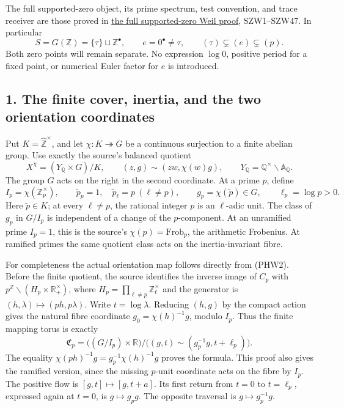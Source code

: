 \documentclass[
  10pt,
  a4paper,
]{article}
\begin{document}
The full supported-zero object, its prime spectrum, test convention, and
trace receiver are those proved in
\href{https://github.com/KokunoYumeto/zeta-function-research-reader/blob/adfbfe74fa49e31cb7aa068cf755fb083be37c32/workbenches/splitzero-tandem/branches/tau-zero-prime-positivity/SUPPORTED_ZERO_PRIME_WEIL_DERIVATION.md}{the
full supported-zero Weil proof}, SZW1--SZW47. In particular \[
S=G(\mathbb Z)=\{\tau\}\sqcup\mathbb Z^\bullet,
\qquad e=0^\bullet\ne\tau,
\qquad(\tau)\subsetneq(e)\subsetneq(p).
\tag{PHW1}
\] Both zero points will remain separate. No expression \(\log0\),
positive period for a fixed point, or numerical Euler factor for \(e\)
is introduced.

\subsection{1. The finite cover, inertia, and the two orientation
coordinates}\label{the-finite-cover-inertia-and-the-two-orientation-coordinates}

Put \(K=\widehat{\mathbb Z}^{\times}\), and let
\(\chi:K\twoheadrightarrow G\) be a continuous surjection to a finite
abelian group. Use exactly the source's balanced quotient \[
X^\chi=(Y_{\mathbb Q}\times G)/K,
\qquad (z,g)\sim(zw,\chi(w)g),
\qquad Y_{\mathbb Q}=\mathbb Q^\times\backslash\mathbb A_{\mathbb Q}.
\tag{PHW2}
\] The group \(G\) acts on the right in the second coordinate. At a
prime \(p\), define \[
I_p=\chi(\mathbb Z_p^\times),\qquad
\widetilde p_p=1,\quad \widetilde p_\ell=p\ (\ell\ne p),
\qquad g_p=\chi(\widetilde p)\in G,
\qquad \ell_p=\log p>0.
\tag{PHW3}
\] Here \(\widetilde p\in K\); at every \(\ell\ne p\), the rational
integer \(p\) is an \(\ell\)-adic unit. The class of \(g_p\) in
\(G/I_p\) is independent of a change of the \(p\)-component. At an
unramified prime \(I_p=1\), this is the source's
\(\chi(p)=\mathrm{Frob}_p\), the arithmetic Frobenius. At ramified
primes the same quotient class acts on the inertia-invariant fibre.

For completeness the actual orientation map follows directly from
(PHW2). Before the finite quotient, the source identifies the inverse
image of \(C_p\) with
\(p^{\mathbb Z}\backslash(H_p\times\mathbb R_+^\times)\), where
\(H_p=\prod_{\ell\ne p}\mathbb Z_\ell^\times\) and the generator is
\((h,\lambda)\mapsto(ph,p\lambda)\). Write \(t=\log\lambda\). Reducing
\((h,g)\) by the compact action gives the natural fibre coordinate
\(g_0=\chi(h)^{-1}g\), modulo \(I_p\). Thus the finite mapping torus is
exactly \[
\mathfrak C_p=
\bigl((G/I_p)\times\mathbb R\bigr)
\big/\bigl((g,t)\sim(g_p^{-1}g,t+\ell_p)\bigr).
\tag{PHW4}
\] The equality \(\chi(ph)^{-1}g=g_p^{-1}\chi(h)^{-1}g\) proves the
formula. This proof also gives the ramified version, since the missing
\(p\)-unit coordinate acts on the fibre by \(I_p\). The positive flow is
\([g,t]\mapsto[g,t+a]\). Its first return from \(t=0\) to \(t=\ell_p\),
expressed again at \(t=0\), is \(g\mapsto g_pg\). The opposite traversal
is \(g\mapsto g_p^{-1}g\).
\end{document}
